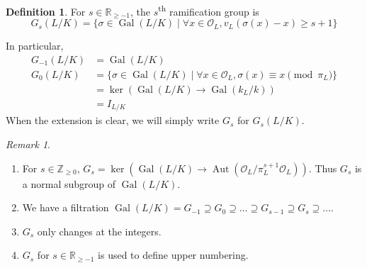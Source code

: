 \documentclass[11pt]{article}
\theoremstyle{definition}
\newtheorem{definition}{Definition}[subsection]
\theoremstyle{plain}
\theoremstyle{remark}
\newtheorem*{remark}{Remark}
\DeclareMathOperator{\Gal}{Gal}
\DeclareMathOperator{\Aut}{Aut}
\newcommand{\ZZ}{\mathbb{Z}}
\newcommand{\RR}{\mathbb{R}}
\newcommand{\cO}{\mathcal{O}}
\begin{document}
\begin{definition}\label{def:14_1}
    For $s \in \RR_{\ge -1}$, the $s$\textsuperscript{th} ramification group is
    \begin{equation*}
        G_s(L / K) = \{\sigma \in \Gal(L/K) \mid \forall x \in \cO_L, v_L(\sigma(x) - x) \ge s + 1\}
    \end{equation*}
\end{definition}
In particular,
\begin{align*}
    G_{-1}(L/K) &= \Gal(L/K)\\
    G_0(L/K)
    &= \{\sigma \in \Gal(L/K) \mid \forall x \in \cO_L, \sigma(x) \equiv x \pmod{\pi_L}\}\\
    &= \ker(\Gal(L/K) \to \Gal(k_L/k))\\
    &= I_{L/K}
\end{align*}
When the extension is clear, we will simply write $G_s$ for $G_s(L/K)$.

\begin{remark}\phantom{}
    \begin{enumerate}
        \item For $s \in \ZZ_{\ge 0}$, $G_s = \ker(\Gal(L/K) \to \Aut(\cO_L / \pi_L^{s+1} \cO_L))$. Thus $G_s$ is a normal subgroup of $\Gal(L/K)$.
        \item We have a filtration $\Gal(L/K) = G_{-1} \supseteq G_0 \supseteq \ldots \supseteq G_{s-1} \supseteq G_s \supseteq \ldots$.
        \item $G_s$ only changes at the integers.
        \item $G_s$ for $s \in \RR_{\ge -1}$ is used to define upper numbering.
    \end{enumerate}
\end{remark}
\end{document}
